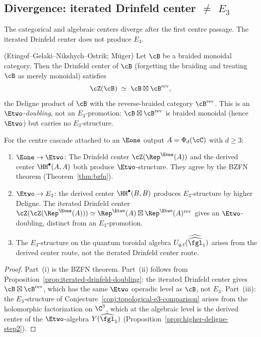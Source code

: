 \subsection{Divergence: iterated Drinfeld center \texorpdfstring{$\neq$}{!=} \texorpdfstring{$E_3$}{E-3}}
\label{subsec:drinfeld-divergence}

The categorical and algebraic centers diverge after the first centre
passage. The iterated Drinfeld center does not produce \(E_3\).

\begin{proposition}
\label{prop:iterated-drinfeld-doubling}
\textup{(Etingof--Gelaki--Nikshych--Ostrik; M\"uger)}
Let $\cB$ be a braided monoidal category. Then the Drinfeld center of $\cB$ (forgetting the braiding and treating $\cB$ as merely monoidal) satisfies
\[
 \cZ(\cB) \;\simeq\; \cB \boxtimes \cB^{\mathrm{rev}},
\]
the Deligne product of $\cB$ with the reverse-braided category $\cB^{\mathrm{rev}}$. This is an $\Etwo$-\emph{doubling}, not an $E_3$-promotion: $\cB \boxtimes \cB^{\mathrm{rev}}$ is braided monoidal (hence $\Etwo$) but carries no $E_3$-structure.
\end{proposition}

\begin{corollary}
\label{cor:derived-center-unique}
For the centre cascade attached to an $\Eone$ output
$A=\Phi_d(\cC)$ with $d\geq3$:
\begin{enumerate}[label=\textup{(\roman*)}]
 \item \emph{$\Eone \to \Etwo$}: The Drinfeld center $\cZ(\Rep^{\Eone}(A))$ and the derived center $\HH^\bullet(A, A)$ both produce $\Etwo$-structure. They agree by the BZFN theorem (Theorem~\ref{thm:bzfn}).
 \item \emph{$\Etwo \to E_3$}: the derived center $\HH^\bullet(B, B)$ produces $E_3$-structure by higher Deligne. The iterated Drinfeld center $\cZ(\cZ(\Rep^{\Eone}(A))) \simeq \Rep^{\Etwo}(A) \boxtimes \Rep^{\Etwo}(A)^{\mathrm{rev}}$ gives an $\Etwo$-doubling, distinct from an $E_3$-promotion.
 \item The $E_3$-structure on the quantum toroidal algebra $U_{q,t}(\widehat{\widehat{\fgl}}_1)$ arises from the derived center route, not the iterated Drinfeld center route.
\end{enumerate}
\end{corollary}

\begin{proof}
Part~(i) is the BZFN theorem. Part~(ii) follows from Proposition~\ref{prop:iterated-drinfeld-doubling}: the iterated Drinfeld center gives $\cB \boxtimes \cB^{\mathrm{rev}}$, which has the same $\Etwo$ operadic level as $\cB$, not $E_3$. Part~(iii): the $E_3$-structure of Conjecture~\ref{conj:topological-e3-comparison} arises from the holomorphic factorization on $\C^3$, which at the algebraic level is the derived center of the $\Etwo$-algebra $Y(\widehat{\fgl}_1)$ (Proposition~\ref{prop:higher-deligne-step2}).
\end{proof}


